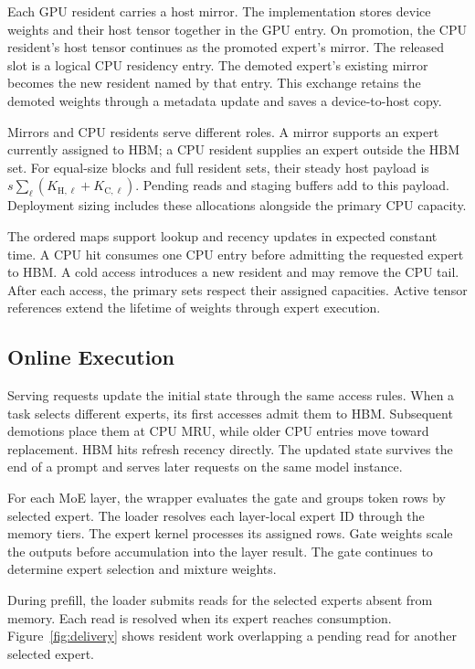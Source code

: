 Each GPU resident carries a host mirror.
The implementation stores device weights and their host tensor together in the GPU entry.
On promotion, the CPU resident's host tensor continues as the promoted expert's mirror.
The released slot is a logical CPU residency entry.
The demoted expert's existing mirror becomes the new resident named by that entry.
This exchange retains the demoted weights through a metadata update and saves a device-to-host copy.

Mirrors and CPU residents serve different roles.
A mirror supports an expert currently assigned to HBM; a CPU resident supplies an expert outside the HBM set.
For equal-size blocks and full resident sets, their steady host payload is $s\sum_\ell(K_{\mathrm H,\ell}+K_{\mathrm C,\ell})$.
Pending reads and staging buffers add to this payload.
Deployment sizing includes these allocations alongside the primary CPU capacity.

The ordered maps support lookup and recency updates in expected constant time.
A CPU hit consumes one CPU entry before admitting the requested expert to HBM.
A cold access introduces a new resident and may remove the CPU tail.
After each access, the primary sets respect their assigned capacities.
Active tensor references extend the lifetime of weights through expert execution.

\subsection{Online Execution}
\label{sec:weight_delivery}
Serving requests update the initial state through the same access rules.
When a task selects different experts, its first accesses admit them to HBM.
Subsequent demotions place them at CPU MRU, while older CPU entries move toward replacement.
HBM hits refresh recency directly.
The updated state survives the end of a prompt and serves later requests on the same model instance.

For each MoE layer, the wrapper evaluates the gate and groups token rows by selected expert.
The loader resolves each layer-local expert ID through the memory tiers.
The expert kernel processes its assigned rows.
Gate weights scale the outputs before accumulation into the layer result.
The gate continues to determine expert selection and mixture weights.

During prefill, the loader submits reads for the selected experts absent from memory.
Each read is resolved when its expert reaches consumption.
Figure~\ref{fig:delivery} shows resident work overlapping a pending read for another selected expert.

